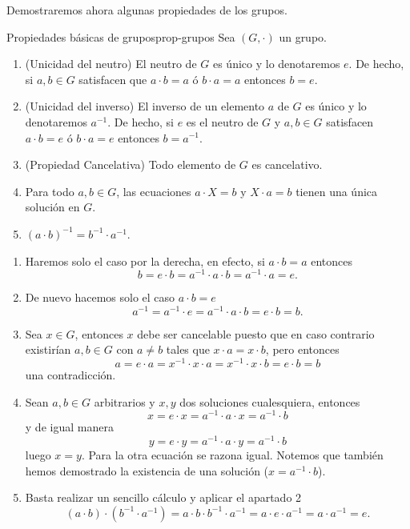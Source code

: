 Demostraremos ahora algunas propiedades de los grupos.

\begin{lemma}{Propiedades básicas de grupos}{prop-grupos}
    Sea \((G,\cdot)\) un grupo.
    \begin{enumerate}
    \item {(Unicidad del neutro)} El neutro de \(G\) es único y lo denotaremos \(e\). De hecho, si \(a,b\in G\) satisfacen que \(a\cdot b = a\) ó \(b\cdot a = a\) entonces \(b = e\).
    \item {(Unicidad del inverso)} El inverso de un elemento \(a\) de \(G\) es único y lo denotaremos \(a^{-1}\). De hecho, si \(e\) es el neutro de \(G\) y \(a,b\in G\) satisfacen \(a\cdot b = e\) ó \(b\cdot a = e\) entonces \(b = a^{-1}\).
    \item {(Propiedad Cancelativa)} Todo elemento de \(G\) es cancelativo.
    \item Para todo \(a,b\in G\), las ecuaciones \(a\cdot X = b\) y \(X\cdot a = b\) tienen una única solución en \(G\).
    \item \((a\cdot b)^{-1} = b^{-1}\cdot a^{-1}\).
    \end{enumerate}
\end{lemma}

\begin{proofbox}
    \begin{enumerate}
    \item
        Haremos solo el caso por la derecha, en efecto, si $a \cdot b = a$ entonces
        \[
        b = e \cdot b = a^{-1} \cdot a \cdot b = a^{-1} \cdot a = e.
        \]

    \item
        De nuevo hacemos solo el caso \(a\cdot b = e\)
        \[
        a^{-1} = a^{-1} \cdot e = a^{-1} \cdot a \cdot b = e \cdot b = b.
        \]

    \item
        Sea $x \in G$, entonces $x$ debe ser cancelable puesto que en caso contrario existirían $a,b \in G$ con $a \neq b$ tales que $x \cdot a = x \cdot b$, pero entonces
        \[
        a = e \cdot a = x^{-1} \cdot x \cdot a = x^{-1} \cdot x \cdot b = e \cdot b = b
        \]
        una contradicción.

    \item
        Sean $a,b \in G$ arbitrarios y $x,y$ dos soluciones cualesquiera, entonces
        \[
        x = e \cdot x = a^{-1} \cdot a \cdot x = a^{-1} \cdot b
        \]
        y de igual manera
        \[
        y = e \cdot y = a^{-1} \cdot a \cdot y = a^{-1} \cdot b
        \]
        luego $x=y$. Para la otra ecuación se razona igual. Notemos que también hemos demostrado la existencia de una solución ($x = a^{-1} \cdot b$).

    \item
        Basta realizar un sencillo cálculo y aplicar el apartado 2
        \[
        (a \cdot b) \cdot (b^{-1} \cdot a^{-1}) = a \cdot b \cdot b^{-1} \cdot a^{-1} = a \cdot e \cdot a^{-1} = a \cdot a^{-1} = e.
        \]

    \end{enumerate}
\end{proofbox}

